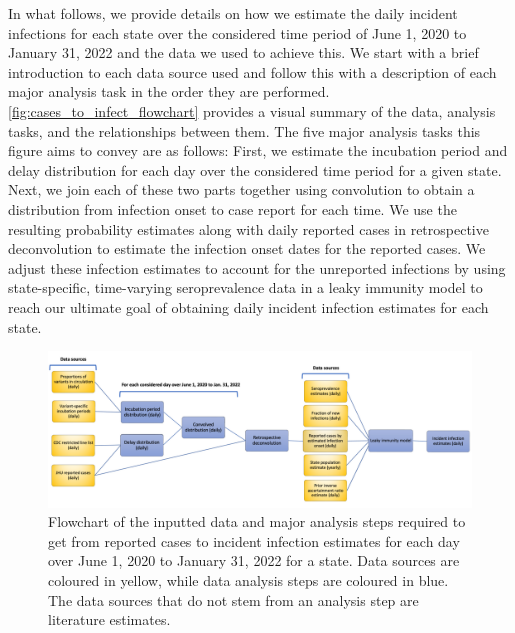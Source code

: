 \documentclass{article}
\begin{document}
In what follows, we provide details on how we estimate the daily incident
infections for each state over the considered time period of June 1, 2020 to
January 31, 2022 and the data we used to achieve this. We start with a brief
introduction to each data source used and follow this with a description of each
major analysis task in the order they are performed.
\autoref{fig:cases_to_infect_flowchart} provides a visual summary of the data,
analysis tasks, and the relationships between them. The five major analysis
tasks this figure aims to convey are as follows: First, we estimate the
incubation period and delay distribution for each day over the considered time
period for a given state. Next, we join each of these two parts together using
convolution to obtain a distribution from infection onset to case report for
each time. We use the resulting probability estimates along with daily reported
cases in retrospective deconvolution to estimate the infection onset dates for
the reported cases. We adjust these infection estimates to account for the
unreported infections by using state-specific, time-varying seroprevalence data
in a leaky immunity model to reach our ultimate goal of obtaining daily incident
infection estimates for each state. 


\begin{figure}[!tb]
\centering
    \includegraphics[width=.99\textwidth]{Reported_cases_to_infect_flowchart.pdf} 
    \caption{Flowchart of the inputted data and major analysis steps required 
    to get from reported cases to incident infection estimates for each day 
    over June 1, 2020 to January 31, 2022 for a state. Data sources are coloured 
    in yellow, while data analysis steps are coloured in blue. The data sources that
    do not stem from an analysis step are literature estimates.}
    \label{fig:cases_to_infect_flowchart}
\end{figure}
\end{document}
